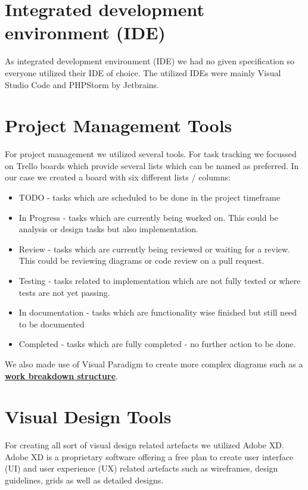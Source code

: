 \section{Integrated development environment (IDE)}\label{sec:integrated-development-environment-(ide)}

As integrated development environment (IDE) we had no given specification so everyone utilized their IDE of choice.
The utilized IDEs were mainly Visual Studio Code and PHPStorm by Jetbrains.

\section{Project Management Tools}\label{sec:project-management-tools}

For project management we utilized several tools.
For task tracking we focussed on Trello boards which provide several lists which can be named as preferred.
In our case we created a board with six different lists / columns:

\begin{itemize}
    \item TODO - tasks which are scheduled to be done in the project timeframe
    \item In Progress - tasks which are currently being worked on.
            This could be analysis or design tasks but also implementation.
    \item Review - tasks which are currently being reviewed or waiting for a review.
            This could be reviewing diagrams or code review on a pull request.
    \item Testing - tasks related to implementation which are not fully tested or where tests are not yet passing.
    \item In documentation - tasks which are functionality wise finished but still need to be documented
    \item Completed - tasks which are fully completed - no further action to be done.
\end{itemize}

We also made use of Visual Paradigm to create more complex diagrams such as a 
\textbf{\hyperref[sec:work-breakdown-structure-(wbs)]{work breakdown structure}}.

\section{Visual Design Tools}\label{sec:visual-design-tools}

For creating all sort of visual design related artefacts we utilized Adobe XD\@.
Adobe XD is a proprietary software offering a free plan to create user interface (UI) and user experience (UX)
related artefacts such as wireframes, design guidelines, grids as well as detailed designs.
